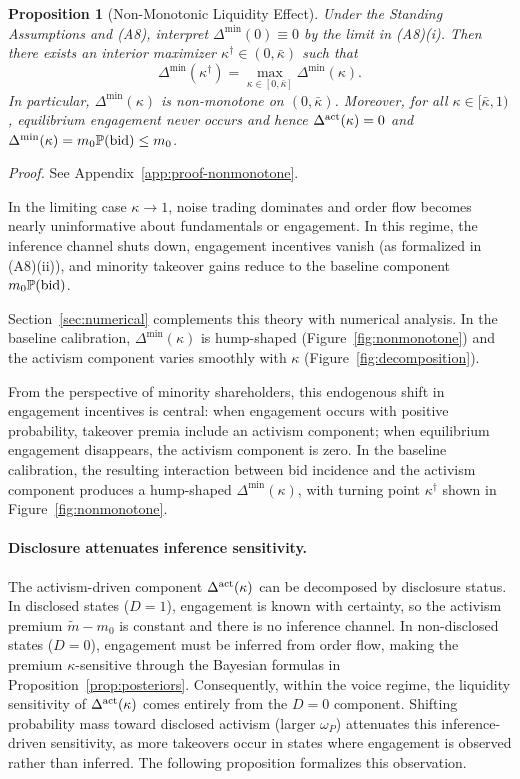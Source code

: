 \documentclass[11pt]{article}
\newtheorem{proposition}{Proposition}
\newcommand{\PP}{\mathbb{P}}
\newcommand{\1}{\mathbf{1}}
\begin{document}
\begin{proposition}[Non-Monotonic Liquidity Effect]
\label{prop:nonmonotone}
Under the Standing Assumptions and \textup{(A8)}, interpret $\Delta^{\min}(0)\equiv 0$ by the limit in \textup{(A8)(i)}. Then there exists an interior maximizer $\kappa^{\dagger}\in(0,\bar{\kappa})$ such that
\[
\Delta^{\min}(\kappa^{\dagger})=\max_{\kappa\in[0,\bar{\kappa}]}\Delta^{\min}(\kappa).
\]
In particular, $\Delta^{\min}(\kappa)$ is non-monotone on $(0,\bar{\kappa})$. Moreover, for all $\kappa\in[\bar{\kappa},1)$, equilibrium engagement never occurs and hence $\Delta^{\textup{act}}(\kappa)=0$ and $\Delta^{\min}(\kappa)=m_0\PP(\textup{bid})\le m_0$.
\end{proposition}
\textit{Proof.} See Appendix~\ref{app:proof-nonmonotone}.

In the limiting case $\kappa\to 1$, noise trading dominates and order flow becomes nearly uninformative about fundamentals or engagement. In this regime, the inference channel shuts down, engagement incentives vanish (as formalized in \textup{(A8)(ii)}), and minority takeover gains reduce to the baseline component $m_0\PP(\textup{bid})$.

Section~\ref{sec:numerical} complements this theory with numerical analysis. In the baseline calibration, $\Delta^{\min}(\kappa)$ is hump-shaped (Figure~\ref{fig:nonmonotone}) and the activism component varies smoothly with $\kappa$ (Figure~\ref{fig:decomposition}).

From the perspective of minority shareholders, this endogenous shift in engagement incentives is central: when engagement occurs with positive probability, takeover premia include an activism component; when equilibrium engagement disappears, the activism component is zero. In the baseline calibration, the resulting interaction between bid incidence and the activism component produces a hump-shaped $\Delta^{\min}(\kappa)$, with turning point $\kappa^{\dagger}$ shown in Figure~\ref{fig:nonmonotone}.

\paragraph{Disclosure attenuates inference sensitivity.}
The activism-driven component $\Delta^{\textup{act}}(\kappa)$ can be decomposed by disclosure status. In disclosed states ($D=1$), engagement is known with certainty, so the activism premium $\tilde{m}-m_0$ is constant and there is no inference channel. In non-disclosed states ($D=0$), engagement must be inferred from order flow, making the premium $\kappa$-sensitive through the Bayesian formulas in Proposition~\ref{prop:posteriors}. Consequently, within the voice regime, the liquidity sensitivity of $\Delta^{\textup{act}}(\kappa)$ comes entirely from the $D=0$ component. Shifting probability mass toward disclosed activism (larger $\omega_P$) attenuates this inference-driven sensitivity, as more takeovers occur in states where engagement is observed rather than inferred. The following proposition formalizes this observation.
\end{document}
